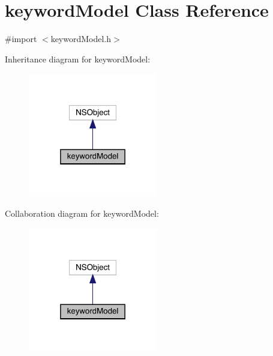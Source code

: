 \hypertarget{interfacekeyword_model}{}\section{keyword\+Model Class Reference}
\label{interfacekeyword_model}


{\ttfamily \#import $<$keyword\+Model.\+h$>$}



Inheritance diagram for keyword\+Model\+:\nopagebreak
\begin{figure}[H]
\begin{center}
\leavevmode
\includegraphics[width=160pt]{interfacekeyword_model__inherit__graph}
\end{center}
\end{figure}


Collaboration diagram for keyword\+Model\+:\nopagebreak
\begin{figure}[H]
\begin{center}
\leavevmode
\includegraphics[width=160pt]{interfacekeyword_model__coll__graph}
\end{center}
\end{figure}
